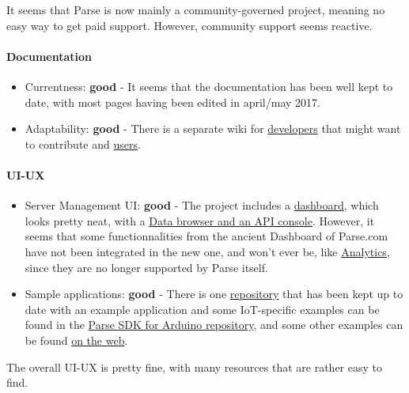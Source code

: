 \documentclass{article}
\begin{document}
It seems that Parse is now mainly a community-governed project, meaning no easy way to get paid support. However, community support seems reactive.

\paragraph{Documentation}

\begin{itemize}
\item Currentness: \textbf{good} - It seems that the documentation has been well kept to date, with most pages having been edited in april/may 2017.
\item Adaptability: \textbf{good} - There is a separate wiki for \href{https://github.com/parse-community/parse-server/wiki}{developers} that might want to contribute and \href{http://docs.parseplatform.org/}{users}.
\end{itemize}

\paragraph{UI-UX}

\begin{itemize}
\item Server Management UI: \textbf{good} - The project includes a \href{https://github.com/parse-community/parse-dashboardweb}{dashboard}, which looks pretty neat, with a \href{http://blog.parse.com/announcements/introducing-the-parse-server-dashboard/}{Data browser and an API console}. However, it seems that some functionnalities from the ancient Dashboard of Parse.com have not been integrated in the new one, and won't ever be, like \href{http://docs.parseplatform.org/parse-server/guide/#compatibility-with-parsecom}{Analytics}, since they are no longer supported by Parse itself.
\item Sample applications: \textbf{good} - There is one \href{https://github.com/parse-community/parse-server-example}{repository} that has been kept up to date with an example application and some IoT-specific examples can be found in the \href{https://github.com/parse-community/Parse-SDK-Arduino}{Parse SDK for Arduino repository}, and some other examples can be found \href{http://teachmetomake.com/wordpress/arduinocloudparsetutorial}{on the web}.
\end{itemize}

The overall UI-UX is pretty fine, with many resources that are rather easy to find.
\end{document}
